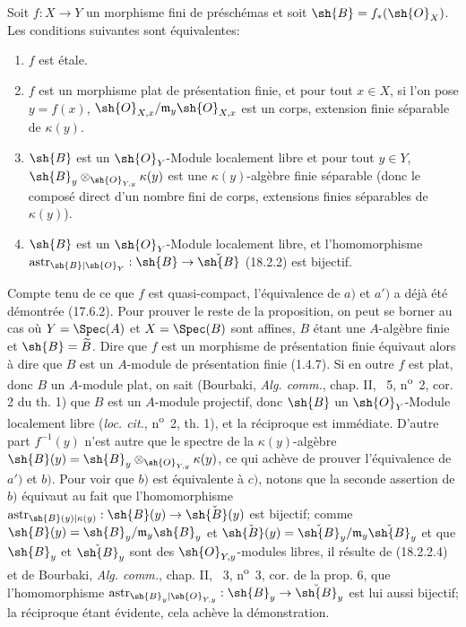
\begin{proposition}[18.2.3]
Soit $f:X\to Y$ un morphisme fini de préschémas et soit $\sh{B}=f_*(\sh{O}_X)$. Les conditions suivantes sont équivalentes:
\begin{enumerate}
  \item[a)] $f$ est étale.
  \item[a$'$)] $f$ est un morphisme plat de présentation finie, et pour tout $x\in X$, si l'on pose $y=f(x)$, $\sh{O}_{X,x}/\mathfrak m_y\sh{O}_{X,x}$ est un corps, extension finie séparable de $\kappa(y)$.
  \item[b)] $\sh{B}$ est un $\sh{O}_Y$-Module localement libre et pour tout $y\in Y$, $\sh{B}_y\otimes_{\sh{O}_{Y,y}}\kappa(y)$ est une $\kappa(y)$-algèbre finie séparable (donc le composé direct d'un nombre fini de corps, extensions finies séparables de $\kappa(y)$).
  \item[c)] $\sh{B}$ est un $\sh{O}_Y$-Module localement libre, et l'homomorphisme $\operatorname{astr}_{\sh{B}|\sh{O}_Y}:\sh{B}\to\check{\sh{B}}$ (18.2.2) est bijectif.
\end{enumerate}
\end{proposition}

Compte tenu de ce que $f$ est quasi-compact, l'équivalence de $a)$ et $a')$ a déjà été démontrée (17.6.2). Pour prouver le reste de la proposition, on peut se borner au cas où $Y=\Spec(A)$ et $X=\Spec(B)$ sont affines, $B$ étant une $A$-algèbre finie et $\sh{B}=\widetilde B$. Dire que $f$ est un morphisme de présentation finie équivaut alors à dire que $B$ est un $A$-module de présentation finie (1.4.7). Si en outre $f$ est plat, donc $B$ un $A$-module plat, on sait (Bourbaki, \emph{Alg. comm.}, chap. II, \textsection~5, n\textsuperscript{o}~2, cor. 2 du th. 1) que $B$ est un $A$-module projectif, donc $\sh{B}$ un $\sh{O}_Y$-Module localement libre (\emph{loc. cit.}, n\textsuperscript{o}~2, th. 1), et la réciproque est immédiate. D'autre part $f^{-1}(y)$ n'est autre que le spectre de la $\kappa(y)$-algèbre $\sh{B}(y)=\sh{B}_y\otimes_{\sh{O}_{Y,y}}\kappa(y)$, ce qui achève de prouver l'équivalence de $a')$ et $b)$. Pour voir que $b)$ est équivalente à $c)$, notons que la seconde assertion de $b)$ équivaut au fait que l'homomorphisme $\operatorname{astr}_{\sh{B}(y)|\kappa(y)}:\sh{B}(y)\to\check{\sh{B}(y)}$ est bijectif; comme $\sh{B}(y)=\sh{B}_y/\mathfrak m_y\sh{B}_y$ et $\check{\sh{B}(y)}=\check{\sh{B}}_y/\mathfrak m_y\check{\sh{B}}_y$ et que $\sh{B}_y$ et $\check{\sh{B}}_y$ sont des $\sh{O}_{Y,y}$-modules libres, il résulte de (18.2.2.4) et de Bourbaki, \emph{Alg. comm.}, chap. II, \textsection~3, n\textsuperscript{o}~3, cor. de la prop. 6, que l'homomorphisme $\operatorname{astr}_{\sh{B}_y|\sh{O}_{Y,y}}:\sh{B}_y\to\check{\sh{B}}_y$ est lui aussi bijectif; la réciproque étant évidente, cela achève la démonstration.

